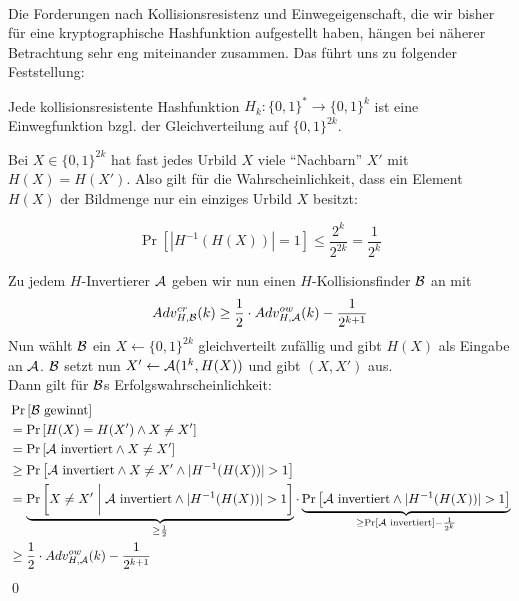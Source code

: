 ~\\
Die Forderungen nach Kollisionsresistenz und Einwegeigenschaft, die wir bisher für eine kryptographische Hashfunktion aufgestellt haben, hängen bei näherer
Betrachtung sehr eng miteinander zusammen. Das führt uns zu folgender Feststellung:
\vspace{10pt}

\begin{theorem}
Jede kollisionsresistente Hashfunktion $H_k \colon \{0,1\}^* \rightarrow \{0,1\}^k$ ist eine Einwegfunktion bzgl. der Gleichverteilung auf $\{0,1\}^{2k}$.
\end{theorem}

\begin{beweisidee}
Bei $X \in \{0,1\}^{2k}$ hat fast jedes Urbild $X$ viele "`Nachbarn"' $X'$ mit $H(X) = H(X')$. Also gilt für die Wahrscheinlichkeit, dass ein Element $H(X)$
der Bildmenge nur ein einziges Urbild $X$ besitzt:

\begin{equation*}
\Pr \left[ | H^{-1}(H(X))| = 1\right] \leq \frac{2^k}{2^{2k}} = \frac{1}{2^k}
\end{equation*}
\end{beweisidee}

\begin{beweis}
Zu jedem $H$-Invertierer $\mathcal{A}$ geben wir nun einen $H$-Kollisionsfinder $\mathcal{B}$ an mit
\begin{equation*}
Adv^{cr}_{H,\mathcal{B}}(k) \geq \frac{1}{2} \cdot Adv^{ow}_{H,\mathcal{A}}(k) - \frac{1}{2^{k+1}}
\end{equation*} 
Nun wählt $\mathcal{B}$ ein $X \leftarrow \{0,1\}^{2k}$ gleichverteilt zufällig und gibt $H(X)$ als Eingabe an $\mathcal{A}$. $\mathcal{B}$ setzt nun $X' \leftarrow \mathcal{A}(1^k, H(X))$ und
gibt $(X, X')$ aus.\\
Dann gilt für $\mathcal{B}$s Erfolgswahrscheinlichkeit:
\begin{align*}
	&\Pr \left[\mathcal{B} \text{ gewinnt}\right]\\
	&= \Pr\left[H(X) = H(X') \land X \not = X'\right]\\
	&= \Pr \left[\mathcal{A} \text{ invertiert} \land X \not = X'\right]\\
	&\geq \Pr \left[\mathcal{A} \text{ invertiert} \land X \not = X' \land \vert H^{-1}(H(X)) \vert > 1\right]\\
	&= \underbrace{\Pr \left[X \not = X' \biggm| \mathcal{A} \text{ invertiert} \land \vert H^{-1}(H(X)) \vert > 1\right]}_{\geq \frac{1}{2}}
	\cdot \underbrace{\Pr \left[\mathcal{A} \text{ invertiert} \land \vert H^{-1}(H(X)) \vert > 1\right]}_{\geq \Pr \left[\mathcal{A} \text{ invertiert}\right] - \frac{1}{2^k}}\\
	&\geq \frac{1}{2} \cdot Adv^{ow}_{H,\mathcal{A}}(k) - \frac{1}{2^{k+1}}
\end{align*}
\qed
\end{beweis}


